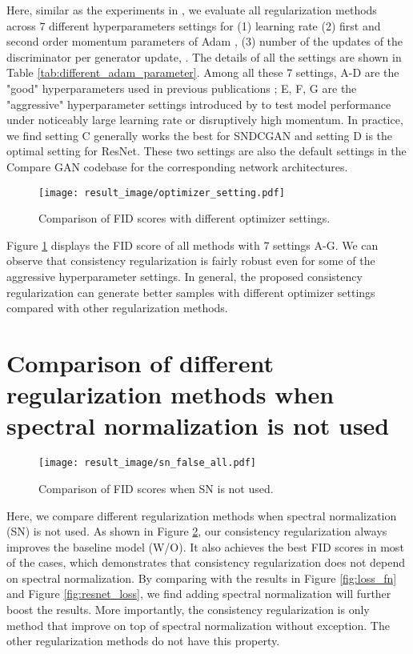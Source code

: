 \documentclass{article} \usepackage{iclr2020_conference,times}
\begin{document}
 Here, similar as the experiments in \citet{Miyato18a, compare_gan}, we evaluate all regularization methods across 7 different hyperparameters settings for (1) learning rate   (2)  first and second order momentum parameters of Adam ,  (3) number of the updates of the discriminator per generator update, . The details of all the settings are shown in Table \ref{tab:different_adam_parameter}. Among all these 7 settings, A-D are the "good" hyperparameters used in previous publications \citep{Radford15, WGANGP, compare_gan}; E, F, G are the "aggressive" hyperparameter settings introduced by \citet{Miyato18a} to test model performance under noticeably large learning rate or disruptively high momentum. In practice, we find setting C generally works the best for SNDCGAN and setting D is the optimal setting for ResNet. These two settings are also the default settings in the Compare GAN codebase for the corresponding network architectures. 
 
 \begin{figure}[hbt]
    \centering
    \texttt{[image: result\_image/optimizer\_setting.pdf]}
    \caption{
    Comparison of FID scores with different optimizer settings.
    }
    \label{fig:optimizer_setting}
\end{figure}
 
Figure \ref{fig:optimizer_setting} displays the FID score of all methods with 7 settings A-G. We can observe that consistency regularization is fairly robust even for some of the aggressive hyperparameter settings. In general, the proposed consistency regularization can generate better samples with different optimizer settings compared with other regularization methods. 


\newpage 
\renewcommand{\thefigure}{B\arabic{figure}}
\setcounter{figure}{0}

\section{Comparison of different regularization methods when spectral normalization is not used} \label{sec:no_sn}


\begin{figure}[hbt]
    \centering
    \texttt{[image: result\_image/sn\_false\_all.pdf]}
    \caption{
    Comparison of FID scores when SN is not used.
    }
    \label{fig:sn_false_all}
\end{figure}

Here, we compare different regularization methods when spectral normalization (SN) is not used. As shown in Figure \ref{fig:sn_false_all}, our consistency regularization always improves the baseline model (W/O). It also achieves the best FID scores in most of the cases, which demonstrates that consistency regularization does not depend on spectral normalization. By comparing with the results in Figure \ref{fig:loss_fn} and Figure \ref{fig:resnet_loss}, we find adding spectral normalization will further boost the results. More importantly, the consistency regularization is only method that improve on top of spectral normalization without exception. The other regularization methods do not have this property. 
\end{document}
